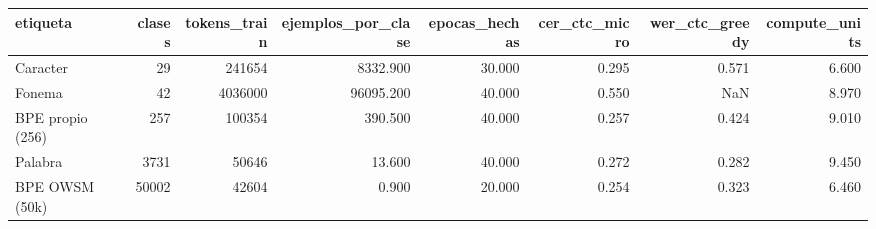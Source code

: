 \begin{tabular}{lrrrrrrr}
\toprule
etiqueta & clases & tokens_train & ejemplos_por_clase & epocas_hechas & cer_ctc_micro & wer_ctc_greedy & compute_units \\
\midrule
Caracter & 29 & 241654 & 8332.900 & 30.000 & 0.295 & 0.571 & 6.600 \\
Fonema & 42 & 4036000 & 96095.200 & 40.000 & 0.550 & NaN & 8.970 \\
BPE propio (256) & 257 & 100354 & 390.500 & 40.000 & 0.257 & 0.424 & 9.010 \\
Palabra & 3731 & 50646 & 13.600 & 40.000 & 0.272 & 0.282 & 9.450 \\
BPE OWSM (50k) & 50002 & 42604 & 0.900 & 20.000 & 0.254 & 0.323 & 6.460 \\
\bottomrule
\end{tabular}
